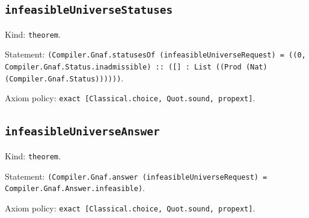 \documentclass[11pt]{article}
\begin{document}
\subsection*{\texttt{infeasibleUniverseStatuses}}
\noindent Kind: \texttt{theorem}.\par
\noindent Statement: \texttt{(Compiler.Gnaf.statusesOf (infeasibleUniverseRequest) = ((0, Compiler.Gnaf.Status.inadmissible) :: ([] : List ((Prod (Nat) (Compiler.Gnaf.Status))))))}.\par
\noindent Axiom policy: \texttt{exact [Classical.choice, Quot.sound, propext]}.\par
\subsection*{\texttt{infeasibleUniverseAnswer}}
\noindent Kind: \texttt{theorem}.\par
\noindent Statement: \texttt{(Compiler.Gnaf.answer (infeasibleUniverseRequest) = Compiler.Gnaf.Answer.infeasible)}.\par
\noindent Axiom policy: \texttt{exact [Classical.choice, Quot.sound, propext]}.\par
\end{document}
